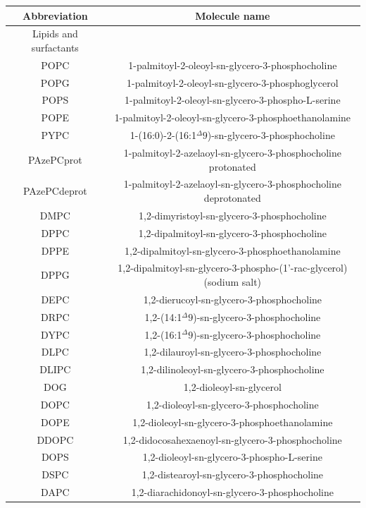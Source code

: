 \documentclass[fleqn,10pt]{wlscirep}
\begin{document}
\begin{table}[p]
    \centering
    \begin{tabular}{c c}
    Abbreviation & Molecule name \\
    \hline
    Lipids and surfactants & \\
    \hline
    POPC &  1-palmitoyl-2-oleoyl-sn-glycero-3-phosphocholine  \\
    POPG &  1-palmitoyl-2-oleoyl-sn-glycero-3-phosphoglycerol \\
    POPS & 1-palmitoyl-2-oleoyl-sn-glycero-3-phospho-L-serine \\
    POPE & 1-palmitoyl-2-oleoyl-sn-glycero-3-phosphoethanolamine \\
    PYPC & 1-(16:0)-2-(16:1$^\Delta9$)-sn-glycero-3-phosphocholine \\
    PAzePCprot & 1-palmitoyl-2-azelaoyl-sn-glycero-3-phosphocholine protonated \\
    PAzePCdeprot & 1-palmitoyl-2-azelaoyl-sn-glycero-3-phosphocholine deprotonated \\
    DMPC & 1,2-dimyristoyl-sn-glycero-3-phosphocholine \\
    DPPC & 1,2-dipalmitoyl-sn-glycero-3-phosphocholine \\
    DPPE & 1,2-dipalmitoyl-sn-glycero-3-phosphoethanolamine \\
    DPPG & 1,2-dipalmitoyl-sn-glycero-3-phospho-(1'-rac-glycerol) (sodium salt) \\
    DEPC & 1,2-dierucoyl-sn-glycero-3-phosphocholine \\
    DRPC & 1,2-(14:1$^\Delta9$)-sn-glycero-3-phosphocholine \\
    DYPC & 1,2-(16:1$^\Delta9$)-sn-glycero-3-phosphocholine \\
    DLPC & 1,2-dilauroyl-sn-glycero-3-phosphocholine \\
    DLIPC& 1,2-dilinoleoyl-sn-glycero-3-phosphocholine \\
    DOG  & 1,2-dioleoyl-sn-glycerol \\
    DOPC & 1,2-dioleoyl-sn-glycero-3-phosphocholine \\
    DOPE & 1,2-dioleoyl-sn-glycero-3-phosphoethanolamine \\
    DDOPC& 1,2-didocosahexaenoyl-sn-glycero-3-phosphocholine \\
    DOPS & 1,2-dioleoyl-sn-glycero-3-phospho-L-serine \\
    DSPC & 1,2-distearoyl-sn-glycero-3-phosphocholine \\
    DAPC & 1,2-diarachidonoyl-sn-glycero-3-phosphocholine \\

\end{tabular}
\end{table}
\end{document}
